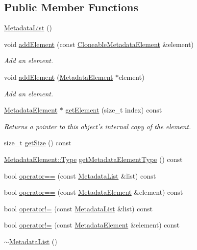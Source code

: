 \subsection*{Public Member Functions}
\begin{DoxyCompactItemize}
\item 
\hyperlink{classBUSBOY_1_1MetadataList_a1a7f49097e6bfe6e876f88473d424b97}{MetadataList} ()
\item 
void \hyperlink{classBUSBOY_1_1MetadataList_aa2cc62a6e005b48aa41fbb7e69118de3}{addElement} (const \hyperlink{classBUSBOY_1_1CloneableMetadataElement}{CloneableMetadataElement} \&element)
\begin{DoxyCompactList}\small\item\em Add an element. \item\end{DoxyCompactList}\item 
void \hyperlink{classBUSBOY_1_1MetadataList_a3e98fddefa5918a97bbf88545354d5a3}{addElement} (\hyperlink{classBUSBOY_1_1MetadataElement}{MetadataElement} $\ast$element)
\begin{DoxyCompactList}\small\item\em Add an element. \item\end{DoxyCompactList}\item 
\hyperlink{classBUSBOY_1_1MetadataElement}{MetadataElement} $\ast$ \hyperlink{classBUSBOY_1_1MetadataList_a1a16e30b617ed2e83e8669e301c9294f}{getElement} (size\_\-t index) const 
\begin{DoxyCompactList}\small\item\em Returns a pointer to this object's internal copy of the element. \item\end{DoxyCompactList}\item 
size\_\-t \hyperlink{classBUSBOY_1_1MetadataList_a406622e64ad69a0be0d217dc98841d8a}{getSize} () const 
\item 
\hyperlink{classBUSBOY_1_1MetadataElement_ab66bf575c7d26f857a2871d42bd97d12}{MetadataElement::Type} \hyperlink{classBUSBOY_1_1MetadataList_a3181a951dff0539250ce1465a2b6cf3a}{getMetadataElementType} () const 
\item 
bool \hyperlink{classBUSBOY_1_1MetadataList_a7dbea89ac583ce3f8900474f22aba2de}{operator==} (const \hyperlink{classBUSBOY_1_1MetadataList}{MetadataList} \&list) const 
\item 
bool \hyperlink{classBUSBOY_1_1MetadataList_a60686cfb013109fed391c0972b9077eb}{operator==} (const \hyperlink{classBUSBOY_1_1MetadataElement}{MetadataElement} \&element) const 
\item 
bool \hyperlink{classBUSBOY_1_1MetadataList_a224d6c162a01e42b6262335a9ef139dd}{operator!=} (const \hyperlink{classBUSBOY_1_1MetadataList}{MetadataList} \&list) const 
\item 
bool \hyperlink{classBUSBOY_1_1MetadataList_a1cc8b9cc195397c871a183a2496dc493}{operator!=} (const \hyperlink{classBUSBOY_1_1MetadataElement}{MetadataElement} \&element) const 
\item 
\hyperlink{classBUSBOY_1_1MetadataList_a4f78901c10de5fc72a7887bf95293e07}{$\sim$MetadataList} ()
\end{DoxyCompactItemize}
